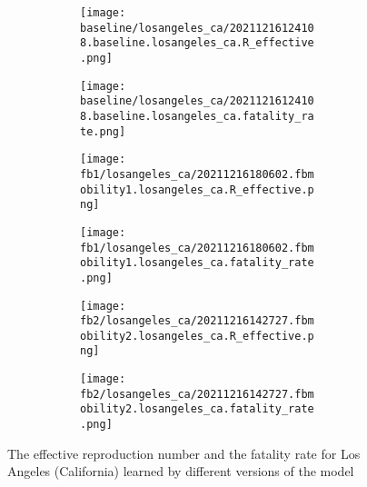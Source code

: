 \begin{figure}[!htb]
    \centering

    \begin{subfigure}[b]{\linewidth}
        \centering
        \begin{subfigure}[b]{0.4\linewidth}
            \texttt{[image: baseline/losangeles\_ca/20211216124108.baseline.losangeles\_ca.R\_effective.png]}
        \end{subfigure}
        \begin{subfigure}[b]{0.4\linewidth}
            \texttt{[image: baseline/losangeles\_ca/20211216124108.baseline.losangeles\_ca.fatality\_rate.png]}
        \end{subfigure}
    \end{subfigure}

    \begin{subfigure}[b]{\linewidth}
        \centering
        \begin{subfigure}[b]{0.4\linewidth}
            \texttt{[image: fb1/losangeles\_ca/20211216180602.fbmobility1.losangeles\_ca.R\_effective.png]}
        \end{subfigure}
        \begin{subfigure}[b]{0.4\linewidth}
            \texttt{[image: fb1/losangeles\_ca/20211216180602.fbmobility1.losangeles\_ca.fatality\_rate.png]}
        \end{subfigure}
    \end{subfigure}

    \begin{subfigure}[b]{\linewidth}
        \centering
        \begin{subfigure}[b]{0.4\linewidth}
            \texttt{[image: fb2/losangeles\_ca/20211216142727.fbmobility2.losangeles\_ca.R\_effective.png]}
        \end{subfigure}
        \begin{subfigure}[b]{0.4\linewidth}
            \texttt{[image: fb2/losangeles\_ca/20211216142727.fbmobility2.losangeles\_ca.fatality\_rate.png]}
        \end{subfigure}
    \end{subfigure}

    \caption{The effective reproduction number and the fatality rate for Los Angeles (California) learned by different versions of the model}
    \label{fig:R0-and-fatality-losangeles}
\end{figure}


